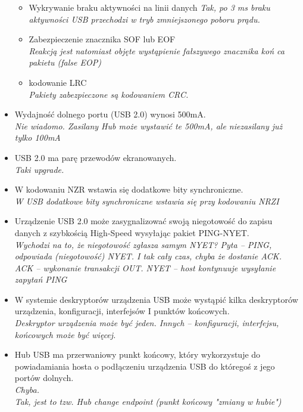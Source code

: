 \begin{itemize}
\begin{itemize}
		\item \textcolor{tak}{Wykrywanie braku aktywności na linii danych}
		{\small \emph{Tak, po 3 ms braku aktywności USB przechodzi w tryb zmniejszonego poboru prądu.}}
		
		\item \textcolor{nie}{Zabezpieczenie znacznika SOF lub EOF} \\
		{\small \emph{Reakcją jest natomiast objęte wystąpienie fałszywego znacznika koń ca pakietu (false EOP)}}
		
		\item \textcolor{nie}{kodowanie LRC} \\
		{\small \emph{Pakiety zabezpieczone są kodowaniem CRC.}}
	\end{itemize}
	
	\item \textcolor{nie}{Wydajność dolnego portu (USB 2.0) wynosi 500mA.} \\
	{\small \emph{Nie wiadomo. Zasilany Hub może wystawić te 500mA, ale niezasilany już tylko 100mA}}
	
	\item \textcolor{tak}{USB 2.0 ma parę przewodów ekranowanych.} \\
	{\small \emph{Taki upgrade.}}
	
	\item \textcolor{nie}{W kodowaniu NZR wstawia się dodatkowe bity synchroniczne.} \\
	{\small \emph{W USB dodatkowe bity synchroniczne wstawia się przy kodowaniu NRZI}}
		
	\item \textcolor{nie}{Urządzenie USB 2.0 może zasygnalizować swoją niegotowość do zapisu danych z szybkością High-Speed wysyłając pakiet PING-NYET.} \\
	{\small \emph{Wychodzi na to, że niegotowość zgłasza samym NYET? Pyta – PING, odpowiada (niegotowość) NYET. I tak cały czas, chyba że dostanie ACK. ACK – wykonanie transakcji OUT. NYET – host kontynuuje wysyłanie zapytań PING}}
	
	\item \textcolor{nie}{W systemie deskryptorów urządzenia USB może wystąpić kilka deskryptorów urządzenia, konfiguracji, interfejsów I punktów końcowych.} \\
	{\small \emph{Deskryptor urządzenia może być jeden. Innych – konfiguracji, interfejsu, końcowych może być więcej.}}
	
	\item \textcolor{tak}{Hub USB ma przerwaniowy punkt końcowy, który wykorzystuje do powiadamiania hosta o podłączeniu	urządzenia USB do któregoś z jego portów dolnych.} \\
	{\small \emph{Chyba.\\
	Tak, jest to tzw. \emph{Hub change endpoint} (punkt końcowy "zmiany w hubie")}}
	

\end{itemize}
